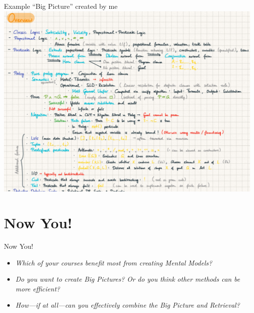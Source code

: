 \documentclass{ercisbeamer}
\begin{document}
\begin{frame}{Example ``Big Picture'' created by me}
    \centering \includegraphics[height=.83\paperheight]{10_resources/big_picture_lsp_example.png}
\end{frame}

\section{Now You!}
\begin{frame}{Now You!}
    \begin{itemize}
        \item \emph{Which of your courses benefit most from creating Mental Models?}
        \item \emph{Do you want to create Big Pictures? Or do you think other methods can be more efficient?}
        \item \emph{How---if at all---can you effectively combine the Big Picture and Retrieval?}
    \end{itemize}
\end{frame}
\end{document}

